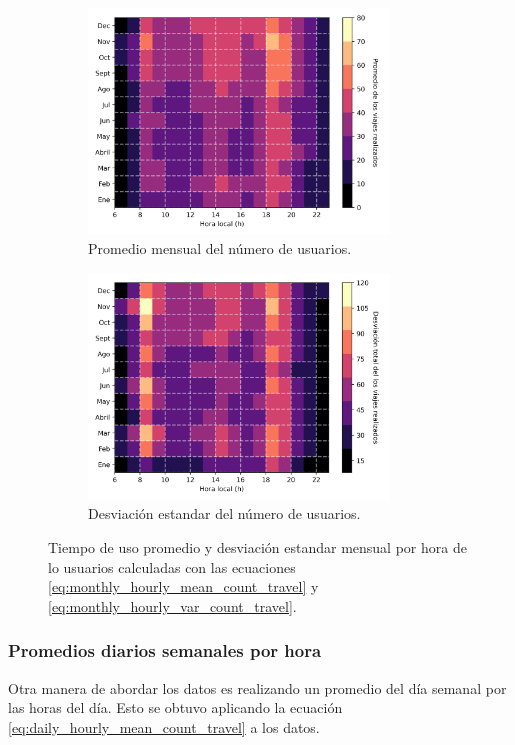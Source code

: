 \begin{figure}[H]
    \centering
    \begin{subfigure}[b]{8cm}
        \includegraphics[width=8cm]{Graphics/monthly_hourly_mean_count_travel.png}
        \caption{Promedio mensual del número de usuarios.}
        \label{fig:monthly_hourly_mean_count_travel}
    \end{subfigure}
    \begin{subfigure}[b]{8cm}
        \includegraphics[width=8cm]{Graphics/monthly_hourly_var_count_travel.png}
        \caption{Desviación estandar del número de usuarios.}
        \label{fig:monthly_hourly_var_count_travel}
    \end{subfigure}
    \caption{Tiempo de uso promedio y desviación estandar mensual por hora de lo usuarios calculadas con las ecuaciones \ref{eq:monthly_hourly_mean_count_travel} y \ref{eq:monthly_hourly_var_count_travel}.}
    \label{fig:monthly_hourly_count_travel}
\end{figure}

\subsubsection{Promedios diarios semanales por hora}

Otra manera de abordar los datos es realizando un promedio del día semanal por las horas del día. Esto se obtuvo aplicando la ecuación \ref{eq:daily_hourly_mean_count_travel} a los datos.

